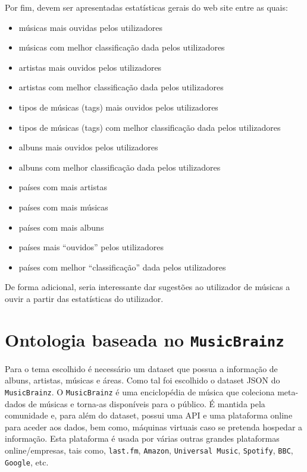 \documentclass{article}
\begin{document}
Por fim, devem ser apresentadas estatísticas gerais do web site entre as quais:
\begin{itemize}
    \item músicas mais ouvidas pelos utilizadores
    \item músicas com melhor classificação dada pelos utilizadores
    \item artistas mais ouvidos pelos utilizadores
    \item artistas com melhor classificação dada pelos utilizadores
    \item tipos de músicas (tags) mais ouvidos pelos utilizadores
    \item tipos de músicas (tags) com melhor classificação dada pelos utilizadores
    \item albuns mais ouvidos pelos utilizadores
    \item albuns com melhor classificação dada pelos utilizadores
    \item países com mais artistas
    \item países com mais músicas
    \item países com mais albuns
    \item países mais ``ouvidos'' pelos utilizadores
    \item países com melhor ``classificação'' dada pelos utilizadores
\end{itemize}

De forma adicional, seria interessante dar sugestões ao utilizador de músicas a ouvir a partir das estatísticas do utilizador.

\section{Ontologia baseada no \texttt{MusicBrainz}} \label{ontologia}

Para o tema escolhido é necessário um dataset que possua a informação de albuns, artistas, músicas e áreas. Como tal foi escolhido o dataset JSON do \texttt{MusicBrainz}. O \texttt{MusicBrainz} é uma enciclopédia de música que coleciona meta-dados de músicas e torna-as disponíveis para o público. É mantida pela comunidade e, para além do dataset, possui uma API e uma plataforma online para aceder aos dados, bem como, máquinas virtuais caso se pretenda hospedar a informação. Esta plataforma é usada por várias outras grandes plataformas online/empresas, tais como, \texttt{last.fm}, \texttt{Amazon}, \texttt{Universal Music}, \texttt{Spotify}, \texttt{BBC}, \texttt{Google}, etc.
\end{document}
